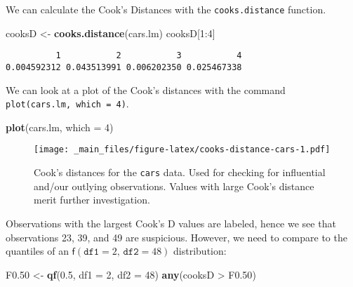 \documentclass[]{book}
\newenvironment{Shaded}{\begin{snugshade}}{\end{snugshade}}
\newcommand{\KeywordTok}[1]{\textcolor[rgb]{0.13,0.29,0.53}{\textbf{{#1}}}}
\newcommand{\DataTypeTok}[1]{\textcolor[rgb]{0.13,0.29,0.53}{{#1}}}
\newcommand{\DecValTok}[1]{\textcolor[rgb]{0.00,0.00,0.81}{{#1}}}
\newcommand{\FloatTok}[1]{\textcolor[rgb]{0.00,0.00,0.81}{{#1}}}
\newcommand{\StringTok}[1]{\textcolor[rgb]{0.31,0.60,0.02}{{#1}}}
\newcommand{\NormalTok}[1]{{#1}}
\numberwithin{equation}{chapter}
\numberwithin{figure}{chapter}
\theoremstyle{plain}
\theoremstyle{definition}
\theoremstyle{remark}
\theoremstyle{definition}
\theoremstyle{definition}
\theoremstyle{remark}
\begin{document}
We can calculate the Cook's Distances with the \texttt{cooks.distance}
function.

\begin{Shaded}
\begin{Highlighting}[]
\NormalTok{cooksD <-}\StringTok{ }\KeywordTok{cooks.distance}\NormalTok{(cars.lm)}
\NormalTok{cooksD[}\DecValTok{1}\NormalTok{:}\DecValTok{4}\NormalTok{]}
\end{Highlighting}
\end{Shaded}

\begin{verbatim}
          1           2           3           4 
0.004592312 0.043513991 0.006202350 0.025467338 
\end{verbatim}

We can look at a plot of the Cook's distances with the command
\texttt{plot(cars.lm,\ which\ =\ 4)}.

\begin{Shaded}
\begin{Highlighting}[]
\KeywordTok{plot}\NormalTok{(cars.lm, }\DataTypeTok{which =} \DecValTok{4}\NormalTok{)}
\end{Highlighting}
\end{Shaded}

\begin{figure}[htbp]
\centering
\texttt{[image: \_main\_files/figure-latex/cooks-distance-cars-1.pdf]}
\caption{\label{fig:cooks-distance-cars}\small Cook's distances for the
\texttt{cars} data. Used for checking for influential and/our outlying
observations. Values with large Cook's distance merit further
investigation.}
\end{figure}






Observations with the largest Cook's D values are labeled, hence we see
that observations 23, 39, and 49 are suspicious. However, we need to
compare to the quantiles of an
\(\mathsf{f}(\mathtt{df1} = 2, \,\mathtt{df2} = 48)\) distribution:

\begin{Shaded}
\begin{Highlighting}[]
\NormalTok{F0}\FloatTok{.50} \NormalTok{<-}\StringTok{ }\KeywordTok{qf}\NormalTok{(}\FloatTok{0.5}\NormalTok{, }\DataTypeTok{df1 =} \DecValTok{2}\NormalTok{, }\DataTypeTok{df2 =} \DecValTok{48}\NormalTok{)}
\KeywordTok{any}\NormalTok{(cooksD >}\StringTok{ }\NormalTok{F0}\FloatTok{.50}\NormalTok{)}
\end{Highlighting}
\end{Shaded}
\end{document}
